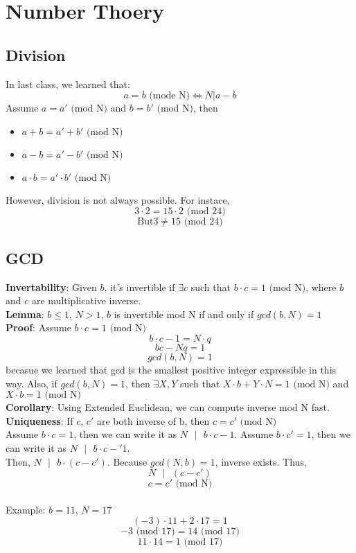 \documentclass{scribe}
\begin{document}
\maketitle


\section{Number Thoery}
\subsection{Division}
In last class, we learned that:
\[a=b \text{ (mode N)} \Longleftrightarrow N|a-b \]
Assume $a=a' \text{ (mod N)}$ and $b=b' \text{ (mod N)}$, then
\begin{itemize}
    \item $a+b = a'+b' \text{ (mod N)}$
    \item $a-b = a'-b' \text{ (mod N)}$
    \item $a \cdot b = a' \cdot b' \text{ (mod N)}$
\end{itemize}
However, division is not always possible. For instace,
\[3 \cdot 2 = 15 \cdot 2 \text{ (mod 24)}\]
\[\text{But} 3\neq 15 \text{ (mod 24)}\]
\subsection{GCD}
\textbf{Invertability}: Given $b$, it's invertible if $\exists c$ such that $b \cdot c = 1 \text{ (mod N)}$, where $b$ and $c$ are multiplicative inverse.
\\\textbf{Lemma}: $b \le 1$, $N>1$, $b$ is invertible mod N if and only if $gcd(b,N)=1$
\\\textbf{Proof}: Assume $b \cdot c = 1 \text{ (mod N)}$
\[b \cdot c -1 = N \cdot q\]
\[bc-Nq=1\]
\[gcd(b,N) = 1\] becasue we learned that gcd is the smallest positive integer expressible in this way.
Also, if $gcd(b,N)=1$, then $\exists X,Y$ such that $X \cdot b + Y \cdot N = 1 \text{ (mod N)}$ and $X \cdot b =1 \text{ (mod N)}$
\\\textbf{Corollary}: Using Extended Euclidean, we can compute inverse mod N fast.
\vspace{5mm}
\\\textbf{Uniqueness}: If $c$, $c'$ are both inverse of b, then $c=c' \text{ (mod N)}$
\\Assume $b \cdot c = 1$, then we can write it as $N \text{ } |\text{ } b\cdot c-1$. Assume $b \cdot c' = 1$, then we can write it as $N \text{ } |\text{ } b\cdot c-'1$.
\\Then, $N \text{ } | \text{ } b \cdot (c-c')$. Because $gcd(N,b) = 1$, inverse exists. Thus,
\[N \text{ } | \text{ } (c-c')\] 
\[c=c' \text{ (mod N)}\]
\\Example: $b=11$, $N=17$
\[(-3) \cdot 11 + 2 \cdot 17 = 1\]
\[-3 \text{ (mod 17)} = 14 \text{ (mod 17)}\]
\[11 \cdot 14 = 1 \text{ (mod 17)}\]
\end{document}
